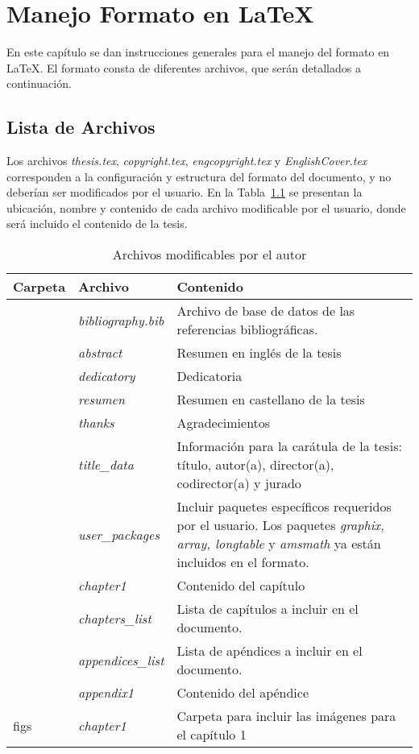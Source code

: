\chapter{Manejo Formato en \LaTeX } \label{LatexFiles}

En este capítulo se dan instrucciones generales para el manejo del formato en \LaTeX. El formato consta de diferentes archivos, que serán detallados a continuación. 

\section{Lista de Archivos}

Los archivos \textit{thesis.tex}, \textit{copyright.tex}, \textit{engcopyright.tex} y \textit{EnglishCover.tex} corresponden a la configuración y estructura del formato del documento, y no deberían ser modificados por el usuario. En la Tabla~\ref{tab:UserFiles} se presentan la ubicación, nombre y contenido de cada archivo modificable por el usuario, donde será incluido el contenido de la tesis.

\begin{table}[ht]
\renewcommand{\arraystretch}{1.3}
    \centering
    \begin{tabular}{>{\centering}p{}p{}p{}} \hline  
    \textbf{Carpeta}  & \textbf{Archivo} & \textbf{Contenido} \\ \hline 
        & \textit{bibliography.bib} & Archivo de base de datos de las referencias bibliográficas.  \\ \hline
    \multirow{6}{*}{preamble} & \textit{abstract } &  Resumen en inglés de la tesis \\ 
     & \textit{dedicatory} & Dedicatoria \\  
     & \textit{resumen} & Resumen en castellano de la tesis \\  
     & \textit{thanks} & Agradecimientos \\  
     & \textit{title\_data} & Información para la carátula de la tesis: título, autor(a), director(a), codirector(a) y jurado \\ 
     & \textit{user\_packages} & Incluir paquetes específicos requeridos por el usuario. Los paquetes \textit{graphix, array, longtable} y \textit{amsmath} ya están incluidos en el formato. \\ \hline
     \multirow{2}{*}{chapters} & \textit{chapter1} &  Contenido del capítulo \\ 
    & \textit{chapters\_list} & Lista de capítulos a incluir en el documento. \\ \hline
    \multirow{2}{*}{appendices} & \textit{appendices\_list} &  Lista de apéndices a incluir en el documento. \\ 
    & \textit{appendix1} & Contenido del apéndice \\ \hline
     figs & \textit{chapter1} &  Carpeta para incluir las imágenes para el capítulo 1 \\ \hline
    \end{tabular}
    \caption{Archivos modificables por el autor}
    \label{tab:UserFiles}
\end{table}

